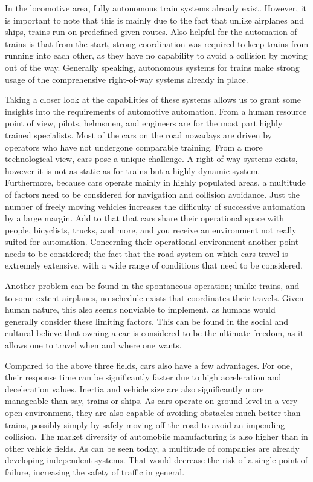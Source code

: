 \documentclass{acm_proc_article-sp}
\begin{document}
In the locomotive area, fully autonomous train systems already exist.
However, it is important to note that this is mainly due to the fact that unlike airplanes and ships, trains run on predefined given routes.
Also helpful for the automation of trains is that from the start, strong coordination was required to keep trains from running into each other, as they have no capability to avoid a collision by moving out of the way.
Generally speaking, autonomous systems for trains make strong usage of the comprehensive right-of-way systems already in place.

Taking a closer look at the capabilities of these systems allows us to grant some insights into the requirements of automotive automation.
From a human resource point of view, pilots, helmsmen, and engineers are for the most part highly trained specialists.
Most of the cars on the road nowadays are driven by operators who have not undergone comparable training.
From a more technological view, cars pose a unique challenge.
A right-of-way systems exists, however it is not as static as for trains but a highly dynamic system.
Furthermore, because cars operate mainly in highly populated areas, a multitude of factors need to be considered for navigation and collision avoidance.
Just the number of freely moving vehicles increases the difficulty of successive automation by a large margin.
Add to that that cars share their operational space with people, bicyclists, trucks, and more, and you receive an environment not really suited for automation.
Concerning their operational environment another point needs to be considered; the fact that the road system on which cars travel is extremely extensive, with a wide range of conditions that need to be considered.

Another problem can be found in the spontaneous operation; unlike trains, and to some extent airplanes, no schedule exists that coordinates their travels.
Given human nature, this also seems nonviable to implement, as humans would generally consider these limiting factors.
This can be found in the social and cultural believe that owning a car is considered to be the ultimate freedom, as it allows one to travel when and where one wants.

Compared to the above three fields, cars also have a few advantages.
For one, their response time can be significantly faster due to high acceleration and deceleration values.
Inertia and vehicle size are also significantly more manageable than say, trains or ships.
As cars operate on ground level in a very open environment, they are also capable of avoiding obstacles much better than trains, possibly simply by safely moving off the road to avoid an impending collision.
The market diversity of automobile manufacturing is also higher than in other vehicle fields.
As can be seen today, a multitude of companies are already developing independent systems.
That would decrease the risk of a single point of failure, increasing the safety of traffic in general.
\end{document}
